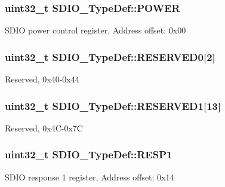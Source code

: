 \subsubsection[{\texorpdfstring{P\+O\+W\+ER}{POWER}}]{ uint32\+\_\+t S\+D\+I\+O\+\_\+\+Type\+Def\+::\+P\+O\+W\+ER}\hypertarget{struct_s_d_i_o___type_def_a7c156bc55f6d970a846a459d57a9e940}{}\label{struct_s_d_i_o___type_def_a7c156bc55f6d970a846a459d57a9e940}
S\+D\+IO power control register, Address offset\+: 0x00 
\subsubsection[{\texorpdfstring{R\+E\+S\+E\+R\+V\+E\+D0}{RESERVED0}}]{\setlength{\rightskip}{0pt plus 5cm}uint32\+\_\+t S\+D\+I\+O\+\_\+\+Type\+Def\+::\+R\+E\+S\+E\+R\+V\+E\+D0\mbox{[}2\mbox{]}}\hypertarget{struct_s_d_i_o___type_def_a33cb9d9c17ad0f0c3071cac5e75297a9}{}\label{struct_s_d_i_o___type_def_a33cb9d9c17ad0f0c3071cac5e75297a9}
Reserved, 0x40-\/0x44 
\subsubsection[{\texorpdfstring{R\+E\+S\+E\+R\+V\+E\+D1}{RESERVED1}}]{\setlength{\rightskip}{0pt plus 5cm}uint32\+\_\+t S\+D\+I\+O\+\_\+\+Type\+Def\+::\+R\+E\+S\+E\+R\+V\+E\+D1\mbox{[}13\mbox{]}}\hypertarget{struct_s_d_i_o___type_def_a4017b35303754e115249d3c75bdf6894}{}\label{struct_s_d_i_o___type_def_a4017b35303754e115249d3c75bdf6894}
Reserved, 0x4\+C-\/0x7C 
\subsubsection[{\texorpdfstring{R\+E\+S\+P1}{RESP1}}]{ uint32\+\_\+t S\+D\+I\+O\+\_\+\+Type\+Def\+::\+R\+E\+S\+P1}\hypertarget{struct_s_d_i_o___type_def_a2b6f1ca5a5a50f8ef5417fe7be22553c}{}\label{struct_s_d_i_o___type_def_a2b6f1ca5a5a50f8ef5417fe7be22553c}
S\+D\+IO response 1 register, Address offset\+: 0x14 
